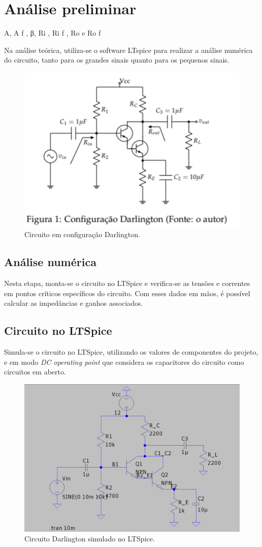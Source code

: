 \section{Análise preliminar}

A, A f , β, Ri , Ri f , Ro
e Ro f



Na análise teórica, utiliza-se o software LTspice para realizar a análise numérica do circuito, tanto para os grandes sinais quanto para os pequenos sinais.

\begin{figure}[h]
    \centering
    \includegraphics[width=0.5\columnwidth]{Images/o_circuito.png}
    \caption{Circuito em configuração Darlington.}
\end{figure}

\subsection{Análise numérica}

Nesta etapa, monta-se o circuito no LTSpice e verifica-se as tensões e correntes em pontos críticos específicos do circuito. Com esses dados em mãos, é possível calcular as impedâncias e ganhos associados.

\subsection{Circuito no LTSpice}

Simula-se o circuito no LTSpice, utilizando os valores de componentes do projeto, e em modo \emph{DC operating point} que considera os capacitores do circuito como circuitos em aberto.

\begin{figure}[H]
    \centering
    \includegraphics[width=0.5\columnwidth]{Images/o_circuito_ltspice.png}
    \caption{Circuito Darlington simulado no LTSpice.}
\end{figure}

